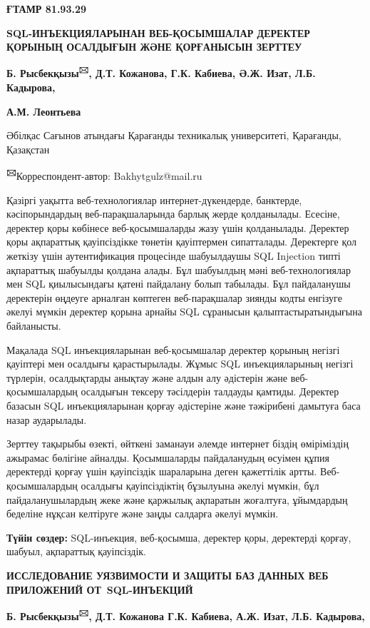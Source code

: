 
\newpage
{\bfseries ҒТАМР 81.93.29}

{\bfseries SQL-ИНЪЕКЦИЯЛАРЫНАН ВЕБ-ҚОСЫМШАЛАР ДЕРЕКТЕР ҚОРЫНЫҢ ОСАЛДЫҒЫН
ЖӘНЕ ҚОРҒАНЫСЫН ЗЕРТТЕУ}

{\bfseries Б. Рысбекқызы\textsuperscript{🖂}, Д.Т. Кожанова, Г.К. Кабиева,
Ә.Ж. Изат, Л.Б. Кадырова,}

{\bfseries А.М. Леонтьева}

Әбілқас Сағынов атындағы Қарағанды техникалық университеті, Қарағанды,
Қазақстан

{\bfseries \textsuperscript{🖂}}Корреспондент-автор: Bakhytgulz@mail.ru

Қазіргі уақытта веб-технологиялар интернет-дүкендерде, банктерде,
кәсіпорындардың веб-парақшаларында барлық жерде қолданылады. Есесіне,
деректер қоры көбінесе веб-қосымшаларды жазу үшін қолданылады. Деректер
қоры ақпараттық қауіпсіздікке төнетін қауіптермен сипатталады.
Деректерге қол жеткізу үшін аутентификация процесінде шабуылдаушы SQL
Injection типті ақпараттық шабуылды қолдана алады. Бұл шабуылдың мәні
веб-технологиялар мен SQL қиылысындағы қатені пайдалану болып табылады.
Бұл пайдаланушы деректерін өңдеуге арналған көптеген веб-парақшалар
зиянды кодты енгізуге әкелуі мүмкін деректер қорына арнайы SQL сұранысын
қалыптастыратындығына байланысты.

Мақалада SQL инъекцияларынан веб-қосымшалар деректер қорының негізгі
қауіптері мен осалдығы қарастырылады. Жұмыс SQL инъекцияларының негізгі
түрлерін, осалдықтарды анықтау және алдын алу әдістерін және
веб-қосымшалардың осалдығын тексеру тәсілдерін талдауды қамтиды.
Деректер базасын SQL инъекцияларынан қорғау әдістеріне және тәжірибені
дамытуға баса назар аударылады.

Зерттеу тақырыбы өзекті, өйткені заманауи әлемде интернет біздің
өміріміздің ажырамас бөлігіне айналды. Қосымшаларды пайдаланудың өсуімен
құпия деректерді қорғау үшін қауіпсіздік шараларына деген қажеттілік
артты. Веб-қосымшалардың осалдығы қауіпсіздіктің бұзылуына әкелуі
мүмкін, бұл пайдаланушылардың жеке және қаржылық ақпаратын жоғалтуға,
ұйымдардың беделіне нұқсан келтіруге және заңды салдарға әкелуі мүмкін.

{\bfseries Түйін сөздер:} SQL-инъекция, веб-қосымша, деректер қоры,
деректерді қорғау, шабуыл, ақпараттық қауіпсіздік.

{\bfseries ИССЛЕДОВАНИЕ УЯЗВИМОСТИ И ЗАЩИТЫ БАЗ ДАННЫХ ВЕБ ПРИЛОЖЕНИЙ
ОТ~SQL-ИНЪЕКЦИЙ}

{\bfseries Б. Рысбекқызы\textsuperscript{🖂}, Д.Т. Кожанова Г.К. Кабиева,
А.Ж. Изат, Л.Б. Кадырова,}


